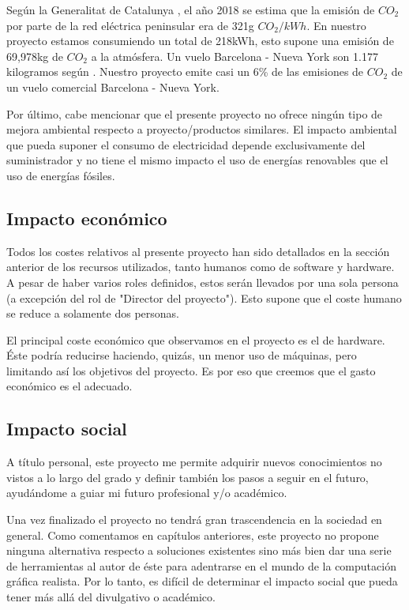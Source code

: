 \documentclass[titlepage,12pt]{report}
\begin{document}
Según la Generalitat de Catalunya \citep{gene}, el año 2018 se estima que la emisión de $CO_{2}$ por parte de la red eléctrica peninsular era de 321g $CO_{2}/kWh$. En nuestro proyecto estamos consumiendo un total de 218kWh, esto supone una emisión de 69,978kg de $CO_{2}$ a la atmósfera. Un vuelo Barcelona -  Nueva York son 1.177 kilogramos según \citep{hostel}. Nuestro proyecto emite casi un 6\% de las emisiones de $CO_{2}$ de un vuelo comercial Barcelona - Nueva York.

Por último, cabe mencionar que el presente proyecto no ofrece ningún tipo de mejora ambiental respecto a proyecto/productos similares. El impacto ambiental que pueda suponer el consumo de electricidad depende exclusivamente del suministrador y no tiene el mismo impacto el uso de energías renovables que el uso de energías fósiles.

\subsection{Impacto económico}

Todos los costes relativos al presente proyecto han sido detallados en la sección anterior de los recursos utilizados, tanto humanos como de software y hardware. A pesar de haber varios roles definidos, estos serán llevados por una sola persona (a excepción del rol de "Director del proyecto"). Esto supone que el coste humano se reduce a solamente dos personas. 

El principal coste económico que observamos en el proyecto es el de hardware. Éste podría reducirse haciendo, quizás, un menor uso de máquinas, pero limitando así los objetivos del proyecto. Es por eso que creemos que el gasto económico es el adecuado.

\subsection{Impacto social}

A título personal, este proyecto me permite adquirir nuevos conocimientos no vistos a lo largo del grado y definir también los pasos a seguir en el futuro, ayudándome a guiar mi futuro profesional y/o académico.

Una vez finalizado el proyecto no tendrá gran trascendencia en la sociedad en general. Como comentamos en capítulos anteriores, este proyecto no propone ninguna alternativa respecto a soluciones existentes sino más bien dar una serie de herramientas al autor de éste para adentrarse en el mundo de la computación gráfica realista. Por lo tanto, es difícil de determinar el impacto social que pueda tener más allá del divulgativo o académico.

\newpage

\printbibliography

\listoffigures

\listoftables
\end{document}
